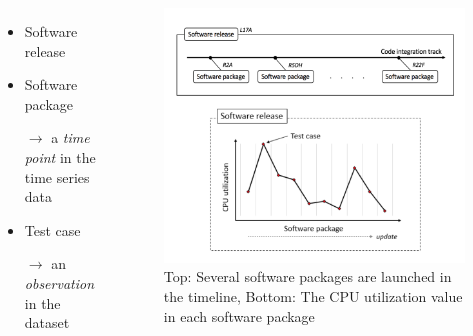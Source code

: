 \documentclass{beamer}
\begin{document}
\begin{frame}

\begin{columns}[c] %
	
	\begin{itemize}
		\item Software release
		\item Software package
		
		$\rightarrow$ a \textit{time point} in the time series data
		
		\item Test case
		
		$\rightarrow$ an \textit{observation} in the dataset 
	\end{itemize}
	
	\begin{figure}
		\includegraphics[width=1\linewidth]{data-mix2}
		\caption{Top: Several software packages are launched in the timeline, Bottom: The CPU utilization value in each software package}
	\end{figure}
	
\end{columns}

\end{frame}
\end{document}
